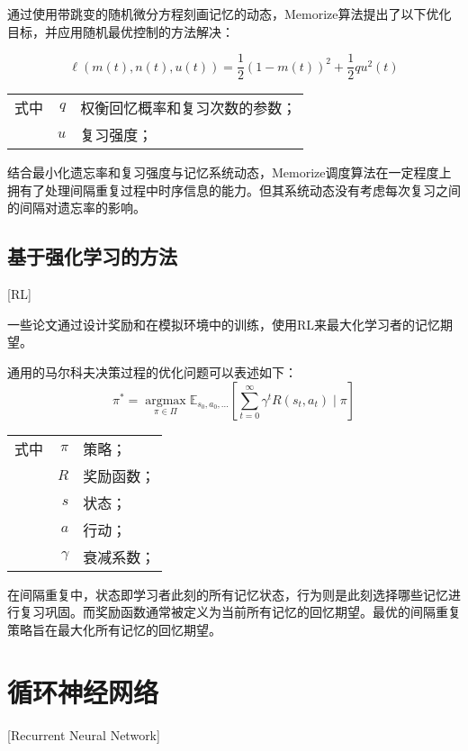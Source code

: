 通过使用带跳变的随机微分方程刻画记忆的动态，Memorize算法提出了以下优化目标，并应用随机最优控制的方法解决：

\begin{equation}
    \ell(m(t), n(t), u(t))=\frac{1}{2}(1-m(t))^{2}+\frac{1}{2} q u^{2}(t)
\end{equation}
\begin{tabularx}{\textwidth}{@{}l@{\quad}r@{———}X@{}}
    式中& $q$ &权衡回忆概率和复习次数的参数；\\
    & $u$ &复习强度；
\end{tabularx}\vspace{3.15bp}

结合最小化遗忘率和复习强度与记忆系统动态，Memorize调度算法在一定程度上拥有了处理间隔重复过程中时序信息的能力。但其系统动态没有考虑每次复习之间的间隔对遗忘率的影响。

\subsection{基于强化学习的方法}[RL]

一些论文\cite{reddyAcceleratingHumanLearning2017,upadhyayDeepReinforcementLearning2018,sinhaUsingDeepReinforcement2019,yangTADSLearningTimeaware2020}通过设计奖励和在模拟环境中的训练，使用RL来最大化学习者的记忆期望。

通用的马尔科夫决策过程的优化问题可以表述如下：
\begin{equation}
    \pi^{*}=\underset{\pi \in \Pi}{\operatorname{argmax}} \mathbb{E}_{s_{0}, a_{0}, \ldots}\left[\sum_{t=0}^{\infty} \gamma^{t} R(s_{t}, a_{t}) \mid \pi\right]
\end{equation}
\begin{tabularx}{\textwidth}{@{}l@{\quad}r@{———}X@{}}
    式中& $\pi$ &策略；\\
    & $R$ &奖励函数；\\
    & $s$ &状态；\\
    & $a$ &行动；\\
    & $\gamma$ &衰减系数；
\end{tabularx}\vspace{3.15bp}

在间隔重复中，状态即学习者此刻的所有记忆状态，行为则是此刻选择哪些记忆进行复习巩固。而奖励函数通常被定义为当前所有记忆的回忆期望。最优的间隔重复策略旨在最大化所有记忆的回忆期望。

\section{循环神经网络}[Recurrent Neural Network]

